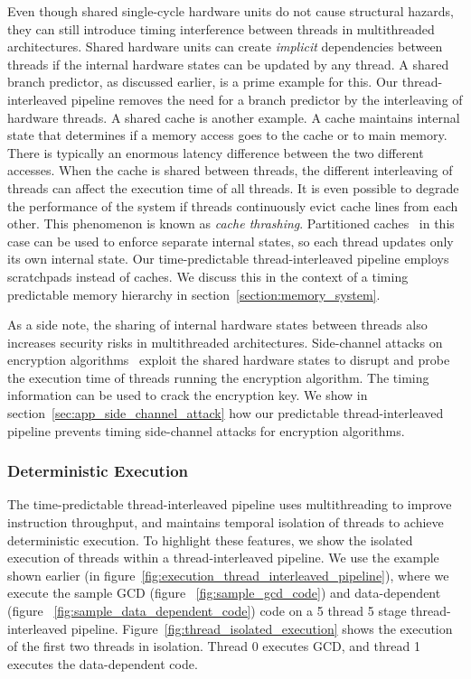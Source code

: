 Even though shared single-cycle hardware units do not cause structural hazards, they can still introduce timing interference between threads in multithreaded architectures. 
Shared hardware units can create \emph{implicit} dependencies between threads if the internal hardware states can be updated by any thread. 
A shared branch predictor, as discussed earlier, is a prime example for this. 
Our thread-interleaved pipeline removes the need for a branch predictor by the interleaving of hardware threads.  
A shared cache is another example.   
A cache maintains internal state that determines if a memory access goes to the cache or to main memory.
There is typically an enormous latency difference between the two different accesses.
When the cache is shared between threads, the different interleaving of threads can affect the execution time of all threads. 
It is even possible to degrade the performance of the system if threads continuously evict cache lines from each other. 
This phenomenon is known as \emph{cache thrashing}.
Partitioned caches~\cite{cachepartition} in this case can be used to enforce separate internal states, so each thread updates only its own internal state.  
Our time-predictable thread-interleaved pipeline employs scratchpads instead of caches.
We discuss this in the context of a timing predictable memory hierarchy in section~\ref{section:memory_system}.   

As a side note, the sharing of internal hardware states between threads also increases security risks in multithreaded architectures. 
Side-channel attacks on encryption algorithms~\cite{Kelsey98sidechannel} exploit the shared hardware states to disrupt and probe the execution time of threads running the encryption algorithm.
The timing information can be used to crack the encryption key.
We show in section~\ref{sec:app_side_channel_attack} how our predictable thread-interleaved pipeline prevents timing side-channel attacks for encryption algorithms.   

\subsubsection{Deterministic Execution}
The time-predictable thread-interleaved pipeline uses multithreading to improve instruction throughput, and maintains temporal isolation of threads to achieve deterministic execution.  
To highlight these features, we show the isolated execution of threads within a thread-interleaved pipeline.
We use the example shown earlier (in figure~\ref{fig:execution_thread_interleaved_pipeline}), where we execute the sample GCD (figure ~\ref{fig:sample_gcd_code}) and data-dependent (figure ~\ref{fig:sample_data_dependent_code}) code on a 5 thread 5 stage thread-interleaved pipeline.   
Figure~\ref{fig:thread_isolated_execution} shows the execution of the first two threads in isolation. 
Thread 0 executes GCD, and thread 1 executes the data-dependent code.

